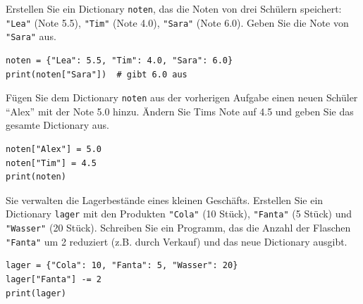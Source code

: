 \begin{myexercise}
	Erstellen Sie ein Dictionary \lstinline|noten|, das die Noten von drei Schülern speichert: \lstinline|"Lea"| (Note 5.5), \lstinline|"Tim"| (Note 4.0), \lstinline|"Sara"| (Note 6.0). Geben Sie die Note von \lstinline|"Sara"| aus.

	\begin{myanswer}
		\begin{lstlisting}
noten = {"Lea": 5.5, "Tim": 4.0, "Sara": 6.0}
print(noten["Sara"])  # gibt 6.0 aus
\end{lstlisting}
	\end{myanswer}
\end{myexercise}

\begin{myexercise}
	Fügen Sie dem Dictionary \lstinline|noten| aus der vorherigen Aufgabe einen neuen Schüler \enquote{Alex} mit der Note 5.0 hinzu. Ändern Sie Tims Note auf 4.5 und geben Sie das gesamte Dictionary aus.

	\begin{myanswer}
		\begin{lstlisting}
noten["Alex"] = 5.0
noten["Tim"] = 4.5
print(noten)
\end{lstlisting}
	\end{myanswer}
\end{myexercise}

\begin{myexercise}
	Sie verwalten die Lagerbestände eines kleinen Geschäfts. Erstellen Sie ein Dictionary \lstinline|lager| mit den Produkten \lstinline|"Cola"| (10 Stück), \lstinline|"Fanta"| (5 Stück) und \lstinline|"Wasser"| (20 Stück). Schreiben Sie ein Programm, das die Anzahl der Flaschen \lstinline|"Fanta"| um 2 reduziert (z.B. durch Verkauf) und das neue Dictionary ausgibt.

	\begin{myanswer}
		\begin{lstlisting}
lager = {"Cola": 10, "Fanta": 5, "Wasser": 20}
lager["Fanta"] -= 2
print(lager)
\end{lstlisting}
	\end{myanswer}
\end{myexercise}

